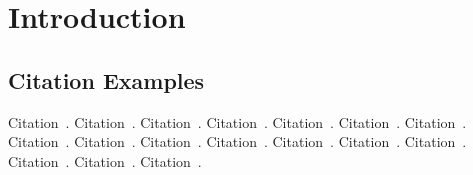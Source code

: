 
\chapter{Introduction}\label{chapter:introduction}

\section{Citation Examples}
Citation~\parencite{rfc-9000}.
Citation~\parencite{draft-moqtransport}.
Citation~\parencite{article-quic-usage}.
Citation~\parencite{internet-quic-usage}.
Citation~\parencite{facebook-quic-usage}.
Citation~\parencite{google-quic-usage}.
Citation~\parencite{quic-nic-offload}.
Citation~\parencite{quic-explained}.
Citation~\parencite{equic-gateway}.
Citation~\parencite{media-streaming-prio-drop}.
Citation~\parencite{quic-nic-offload-patent}.
Citation~\parencite{kernel-bypass-msc-thesis}.
Citation~\parencite{quic-go-repo}.
Citation~\parencite{quic-go-prio-packs-repo}.
Citation~\parencite{adaptive-moq-repo}.
Citation~\parencite{priority-moqtransport-repo}.
Citation~\parencite{fast-relays-thesis-repo}.





